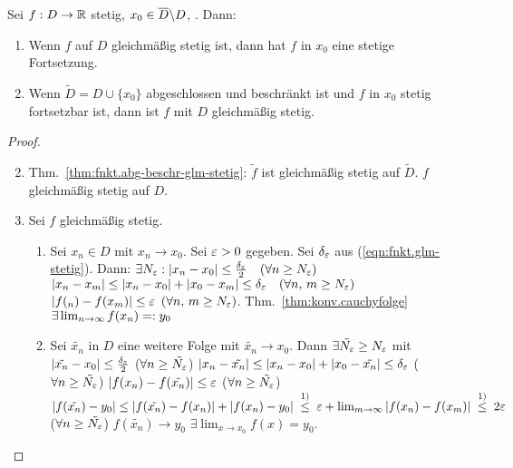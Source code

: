\documentclass[12pt]{scrreprt}
\begin{document}
\begin{satz}Sei $f:D\rightarrow \mathbb{R}$ stetig, $x_0\in\overline{D}\backslash D$, . Dann:\label{satz:fnkt.glm-stetig-forts}
\begin{enumerate}
\item Wenn $f$ auf $D$ gleichmäßig stetig ist, dann hat $f$ in $x_0$ eine stetige Fortsetzung. \label{satz:fnkt.glm-stetig-forts.a}
\item Wenn $\tilde{D}=D\cup\{x_0\}$ abgeschlossen und beschränkt ist und $f$ in $x_0$ stetig fortsetzbar ist, 
dann ist $f$ mit $D$ gleichmäßig stetig.\label{satz:fnkt.glm-stetig-forts.b}
\end{enumerate}
\end{satz}
\begin{proof}
\begin{enumerate}\setcounter{enumi}{1}
\item Thm.~\ref{thm:fnkt.abg-beschr-glm-stetig}: $\tilde{f}$ ist gleichmäßig stetig auf $\tilde{D}$. \folgt 
$f$ gleichmäßig stetig auf $D$.\setcounter{enumi}{0}
\item Sei $f$ gleichmäßig stetig.
\begin{enumerate}
\item Sei $x_n\in D$ mit $x_n\to x_0$. Sei $\varepsilon>0$ gegeben. Sei $\delta_\varepsilon$ aus (\ref{eqn:fnkt.glm-stetig}). Dann:
$\exists N_\varepsilon: \left\lvert x_n - x_0\right\lvert \le \frac{\delta_\varepsilon}{2}\quad (\forall n \ge N_\varepsilon)$
\folgt $\left\lvert x_n - x_m\right\lvert \le \left\lvert x_n - x_0\right\lvert + \left\lvert x_0 - x_m\right\lvert \le \delta_\varepsilon\quad (\forall n,\,m \ge N_\varepsilon)$ 
\folgtnach{(\ref{eqn:fnkt.glm-stetig})} $\left\lvert f(_n) - f(x_m)\right\lvert \le \varepsilon$ $(\forall n,\,m \ge N_\varepsilon)$. 
Thm.~\ref{thm:konv.cauchyfolge} \folgt $\exists \lim_{n\rightarrow\infty} f(x_n) =: y_0$
\item Sei $\tilde{x_n}$ in $D$ eine weitere Folge mit $\tilde{x_n} \to x_0$. Dann $\exists \tilde{N_\varepsilon} \ge N_\varepsilon$
mit $\left\lvert\tilde{x_n} - x_0\right\lvert \le \frac{\delta_\varepsilon}{2}$ ($\forall n \ge \tilde{N_\varepsilon}$)
\folgt $\left\lvert x_n - \tilde{x_n}\right\lvert \le \left\lvert x_n - x_0\right\lvert + \left\lvert x_0 - \tilde{x_n}\right\lvert \le \delta_\varepsilon$ ($\forall n \ge \tilde{N_\varepsilon}$)
\folgtnach{(\ref{eqn:fnkt.glm-stetig})} $\left\lvert f(x_n) - f(\tilde{x_n})\right\lvert \le \varepsilon$  ($\forall n \ge \tilde{N_\varepsilon}$)
\folgt $\abs{f(\tilde{x_n}) - y_0} \le \abs{f(\tilde{x_n}) - f(x_n)} + \abs{f(x_n) - y_0} \nach{\le}{1)}
\ep + \lim_{m\to\infty}\abs{f(x_n)-f(x_m)} \nach{\le}{1)} 2\ep$ ($\forall n \ge \tilde{N_\varepsilon}$)
\folgt $f(\tilde{x_n}) \to y_0$ \folgt $\exists\lim_{x\to x_0} f(x) = y_0$.
\end{enumerate}
\end{enumerate}
\end{proof}
\end{document}

